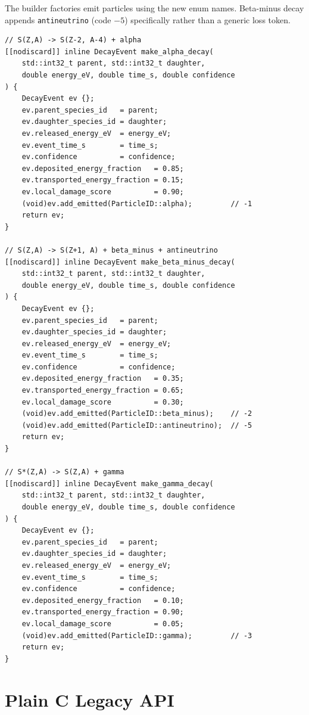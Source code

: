 \documentclass[11pt,a4paper]{article}
\begin{document}
The builder factories emit particles using the new enum names.
Beta-minus decay appends \texttt{antineutrino} (code $-5$) specifically
rather than a generic loss token.

\begin{lstlisting}[style=cpp20,
  caption={Alpha, beta-minus, and gamma decay factories}]
// S(Z,A) -> S(Z-2, A-4) + alpha
[[nodiscard]] inline DecayEvent make_alpha_decay(
    std::int32_t parent, std::int32_t daughter,
    double energy_eV, double time_s, double confidence
) {
    DecayEvent ev {};
    ev.parent_species_id   = parent;
    ev.daughter_species_id = daughter;
    ev.released_energy_eV  = energy_eV;
    ev.event_time_s        = time_s;
    ev.confidence          = confidence;
    ev.deposited_energy_fraction   = 0.85;
    ev.transported_energy_fraction = 0.15;
    ev.local_damage_score          = 0.90;
    (void)ev.add_emitted(ParticleID::alpha);         // -1
    return ev;
}

// S(Z,A) -> S(Z+1, A) + beta_minus + antineutrino
[[nodiscard]] inline DecayEvent make_beta_minus_decay(
    std::int32_t parent, std::int32_t daughter,
    double energy_eV, double time_s, double confidence
) {
    DecayEvent ev {};
    ev.parent_species_id   = parent;
    ev.daughter_species_id = daughter;
    ev.released_energy_eV  = energy_eV;
    ev.event_time_s        = time_s;
    ev.confidence          = confidence;
    ev.deposited_energy_fraction   = 0.35;
    ev.transported_energy_fraction = 0.65;
    ev.local_damage_score          = 0.30;
    (void)ev.add_emitted(ParticleID::beta_minus);    // -2
    (void)ev.add_emitted(ParticleID::antineutrino);  // -5
    return ev;
}

// S*(Z,A) -> S(Z,A) + gamma
[[nodiscard]] inline DecayEvent make_gamma_decay(
    std::int32_t parent, std::int32_t daughter,
    double energy_eV, double time_s, double confidence
) {
    DecayEvent ev {};
    ev.parent_species_id   = parent;
    ev.daughter_species_id = daughter;
    ev.released_energy_eV  = energy_eV;
    ev.event_time_s        = time_s;
    ev.confidence          = confidence;
    ev.deposited_energy_fraction   = 0.10;
    ev.transported_energy_fraction = 0.90;
    ev.local_damage_score          = 0.05;
    (void)ev.add_emitted(ParticleID::gamma);         // -3
    return ev;
}
\end{lstlisting}

\section{Plain C Legacy API}
\end{document}
